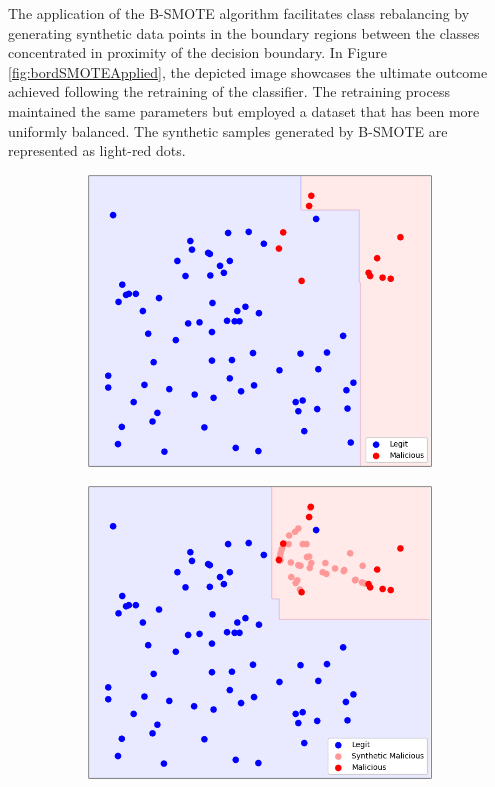The application of the B-SMOTE algorithm facilitates class rebalancing by generating synthetic data points in the boundary regions between the classes concentrated in proximity of the decision boundary.
In Figure \ref{fig:bordSMOTEApplied}, the depicted image showcases the ultimate outcome achieved following the retraining of the classifier. 
The retraining process maintained the same parameters but employed a dataset that has been more uniformly balanced.
The synthetic samples generated by B-SMOTE are represented as light-red dots.
\begin{figure}[H]
  \centering
  \begin{subfigure}{0.49\linewidth}
    \includegraphics[width=\linewidth]{graphics/BordSMOTE_no.png}
    \caption{}
    \label{fig:bordSMOTEnotApplied}
  \end{subfigure}
  \begin{subfigure}{0.49\linewidth}
    \includegraphics[width=\linewidth]{graphics/BordSMOTE_yes.png}

\end{subfigure}
\end{figure}
